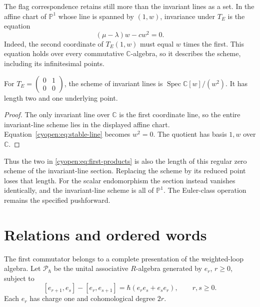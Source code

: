 The flag correspondence retains still more than the invariant
lines as a set. In the affine chart of $\mathbb P^1$ whose line
is spanned by $(1,w)$, invariance under $T_E$ is the equation
\begin{equation}\label{cyopen:eq:stable-line}
 (\mu-\lambda)w-cw^2=0.
\end{equation}
Indeed, the second coordinate of $T_E(1,w)$ must equal $w$
times the first. This equation holds over every commutative
$\mathbb C$-algebra, so it describes the scheme, including its
infinitesimal points.

\begin{proposition}
\label{cyopen:prop:double-line}
For $T_E=\left(\begin{smallmatrix}0&1\\0&0\end{smallmatrix}\right)$,
the scheme of invariant lines is
$\operatorname{Spec}\mathbb C[w]/(w^2)$.
It has length two and one underlying point.
\end{proposition}
\begin{proof}
The only invariant line over $\mathbb C$ is the first coordinate
line, so the entire invariant-line scheme lies in the displayed
affine chart. Equation~\eqref{cyopen:eq:stable-line} becomes $w^2=0$.
The quotient has basis $1,w$ over $\mathbb C$.
\end{proof}

Thus the two in \eqref{cyopen:eq:first-products} is also the
length of this regular zero scheme of the invariant-line section.
Replacing the scheme by its reduced point loses that length.
For the scalar endomorphism the section instead vanishes identically,
and the invariant-line scheme is all of $\mathbb P^1$.
The Euler-class operation remains the specified pushforward.

\section{Relations and ordered words}

The first commutator belongs to a complete presentation of the
weighted-loop algebra. Let $\mathcal P_\hbar$ be the unital
associative $R$-algebra generated by $e_r$, $r\geq0$, subject to
\begin{equation}\label{cyopen:eq:relations}
 [e_{r+1},e_s]-[e_r,e_{s+1}]
 =\hbar(e_re_s+e_se_r),\qquad r,s\geq0.
\end{equation}
Each $e_r$ has charge one and cohomological degree $2r$.

